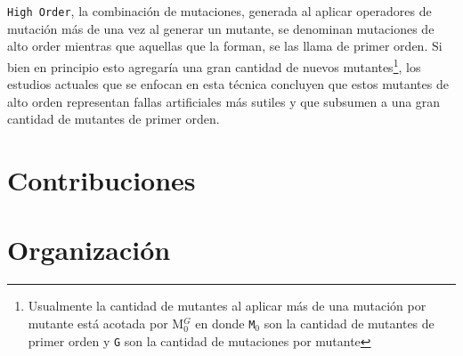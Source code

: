 \texttt{High Order}, la combinaci\'on de mutaciones, generada al aplicar operadores de mutaci\'on m\'as de una vez al generar un mutante, se denominan mutaciones de alto order mientras que aquellas que la forman, se las llama de primer orden. Si bien en principio esto agregar\'ia una gran cantidad de nuevos mutantes\footnote{Usualmente la cantidad de mutantes al aplicar m\'as de una mutaci\'on por mutante est\'a acotada por M$_0^G$ en donde \texttt{M$_0$} son la cantidad de mutantes de primer orden y \texttt{G} son la cantidad de mutaciones por mutante}, los estudios actuales que se enfocan en esta t\'ecnica concluyen que estos mutantes de alto orden representan fallas artificiales m\'as sutiles y que subsumen a una gran cantidad de mutantes de primer orden.

\section{Contribuciones}
\label{sec:intro.contribuciones}



\section{Organizaci\'on}
\label{sec:intro.organizacion}


